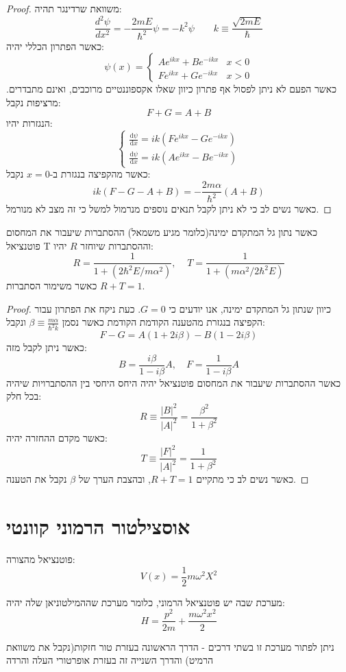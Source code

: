 \documentclass{tstextbook}
\begin{document}
\begin{proof}
משוואת שרדינגר תהיה:
$${\frac{d^{2}\psi}{d x^{2}}}=-{\frac{2m E}{\hbar^{2}}}\psi=-k^{2}\psi \qquad k\equiv{\frac{\sqrt{2m E}}{\hbar}}$$
כאשר הפתרון הכללי יהיה:
$$\psi(x)=\begin{cases}A e^{i k x}+B e^{-i k x} & x<0 \\F e^{i k x}+G e^{-i k x} & x> 0
\end{cases}$$
כאשר הפעם לא ניתן לפסול אף פתרון כיוון שאלו אקספוננטיים מרוכבים, ואינם מתבדרים. מרציפות נקבל:
$$F+G=A+B$$
הנגזרות יהיו:
$$\begin{cases}\frac{\mathrm{d} \psi}{\mathrm{d} x} =i k\left(F e^{i k x}-G e^{-i k x}\right) \\\frac{\mathrm{d} \psi}{\mathrm{d} x} =i k\left(A e^{i k x}-B e^{-i k x}\right)
\end{cases}$$
כאשר מהקפיצה בנגזרת ב-\(x=0\) נקבל:
$$ik(F-G-A+B)=-\frac{2m\alpha}{\hbar^{2}}(A+B)$$
כאשר נשים לב כי לא ניתן לקבל תנאים נוספים מנרמול למשל כי זה מצב לא מנורמל.

\end{proof}
\begin{proposition}
כאשר נתון גל המתקדם ימינה(כלומר מגיע משמאל) ההסתברות שיעבור את המחסום פוטנציאל T וההסתברות שיוחזר \(R\) יהיו:
$$R=\frac{1}{1+\left(2\hbar^{2}E/m\alpha^{2}\right)},\;\;\;\;T=\frac{1}{1+(m\alpha^{2}/2\hbar^{2}E)}$$
כאשר משימור הסתברות \(R+T=1\).

\end{proposition}
\begin{proof}
כיוון שנתון גל המתקדם ימינה, אנו יודעים כי \(G=0\). כעת ניקח את הפתרון עבור הקפיצה בנגזרת מהטענה הקודמת הקודמת כאשר נסמן \(\beta \equiv \frac{m\alpha}{\hbar^{2}k}\) ונקבל:
$$F-G=A\left(1+2i\beta\right)-B\left(1-2i\beta\right)$$
כאשר ניתן לקבל מזה:
$$B=\frac{i\beta}{1-i\beta}A,\quad F=\frac{1}{1-i\beta}A$$
כאשר ההסתברות שיעבור את המחסום פוטנציאל יהיה היחס היחסי בין ההסתברויות  שיהיה בכל חלק:
$$R\equiv\frac{|B|^{2}}{|A|^{2}}=\frac{\beta^{2}}{1+\beta^{2}}$$
כאשר מקדם ההחזרה יהיה:
$$T\equiv\frac{|F|^{2}}{|A|^{2}}=\frac{1}{1+\beta^{2}}$$
כאשר נשים לב כי מתקיים \(R+T=1\), ובהצבת הערך של \(\beta\) נקבל את הטענה.

\end{proof}
\section{אוסצילטור הרמוני קוונטי}

\begin{definition}
פוטנציאל מהצורה:
$$V(x)={\frac{1}{2}}m\omega^{2}X^{2}$$

\end{definition}
\begin{definition}
מערכת שבה יש פוטנציאל הרמוני, כלומר מערכת שההמילטוניאן שלה יהיה:
$$H={\frac{p^{2}}{2m}}+{\frac{m\omega^{2}x^{2}}{2}}$$

\end{definition}
ניתן לפתור מערכת זו בשתי דרכים - הדרך הראשונה בעזרת טור חזקות(נקבל את משוואת הרמיט) והדרך השנייה זה בעזרת אופרטורי העלה והרדה
\end{document}
